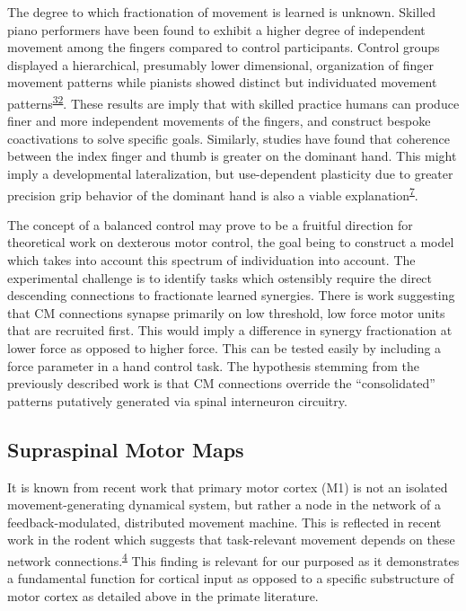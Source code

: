 \documentclass[
  a4paper,
]{article}
\begin{document}
The degree to which fractionation of movement is learned is unknown.
Skilled piano performers have been found to exhibit a higher degree of
independent movement among the fingers compared to control participants.
Control groups displayed a hierarchical, presumably lower dimensional,
organization of finger movement patterns while pianists showed distinct
but individuated movement
patterns\textsuperscript{\protect\hyperlink{ref-furuyaFlexibilityMovementOrganization2013}{32}}.
These results are imply that with skilled practice humans can produce
finer and more independent movements of the fingers, and construct
bespoke coactivations to solve specific goals. Similarly, studies have
found that coherence between the index finger and thumb is greater on
the dominant hand. This might imply a developmental lateralization, but
use-dependent plasticity due to greater precision grip behavior of the
dominant hand is also a viable
explanation\textsuperscript{\protect\hyperlink{ref-fuglevandMechanicalPropertiesNeural2011}{7}}.

The concept of a balanced control may prove to be a fruitful direction
for theoretical work on dexterous motor control, the goal being to
construct a model which takes into account this spectrum of
individuation into account. The experimental challenge is to identify
tasks which ostensibly require the direct descending connections to
fractionate learned synergies. There is work suggesting that CM
connections synapse primarily on low threshold, low force motor units
that are recruited first. This would imply a difference in synergy
fractionation at lower force as opposed to higher force. This can be
tested easily by including a force parameter in a hand control task. The
hypothesis stemming from the previously described work is that CM
connections override the ``consolidated'' patterns putatively generated
via spinal interneuron circuitry.

\hypertarget{supraspinal-motor-maps}{%
\subsection{Supraspinal Motor Maps}\label{supraspinal-motor-maps}}

It is known from recent work that primary motor cortex (M1) is not an
isolated movement-generating dynamical system, but rather a node in the
network of a feedback-modulated, distributed movement machine. This is
reflected in recent work in the rodent which suggests that task-relevant
movement depends on these network
connections.\textsuperscript{\protect\hyperlink{ref-sauerbreiCorticalPatternGeneration2019}{4}}
This finding is relevant for our purposed as it demonstrates a
fundamental function for cortical input as opposed to a specific
substructure of motor cortex as detailed above in the primate
literature.
\end{document}
